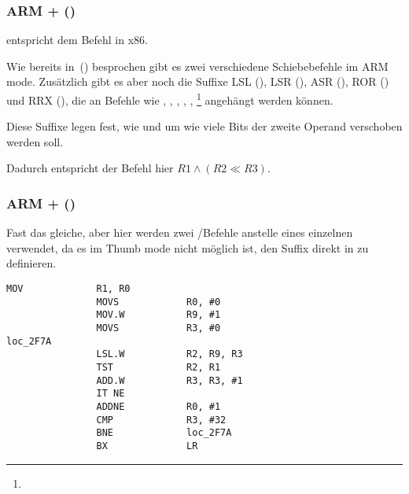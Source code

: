 \subsubsection{ARM + \OptimizingXcodeIV (\ARMMode)}



\TST entspricht dem Befehl \TEST in x86.

Wie bereits in~() besprochen gibt es zwei verschiedene
Schiebebefehle im ARM mode.
Zusätzlich gibt es aber noch die Suffixe
LSL (), 
LSR (), 
ASR (), 
ROR () und
RRX (), die an Befehle wie \MOV, \TST,
\CMP, \ADD, \SUB, \RSB\footnote{\DataProcessingInstructionsFootNote} angehängt
werden können.

Diese Suffixe legen fest, wie und um wie viele Bits der zweite Operand
verschoben werden soll.

Dadurch entspricht der Befehl  hier 
$R1 \land (R2 \ll R3)$.

\subsubsection{ARM + \OptimizingXcodeIV (\ThumbTwoMode)}

Fast das gleiche, aber hier werden zwei /\TST Befehle anstelle eines
einzelnen \TST verwendet, da es im Thumb mode nicht möglich ist, den Suffix \LSL
direkt in \TST zu definieren.

\begin{lstlisting}[label=ARM_leaf_example5,style=customasmARM]
                MOV             R1, R0
                MOVS            R0, #0
                MOV.W           R9, #1
                MOVS            R3, #0
loc_2F7A
                LSL.W           R2, R9, R3
                TST             R2, R1
                ADD.W           R3, R3, #1
                IT NE
                ADDNE           R0, #1
                CMP             R3, #32
                BNE             loc_2F7A
                BX              LR
\end{lstlisting}

